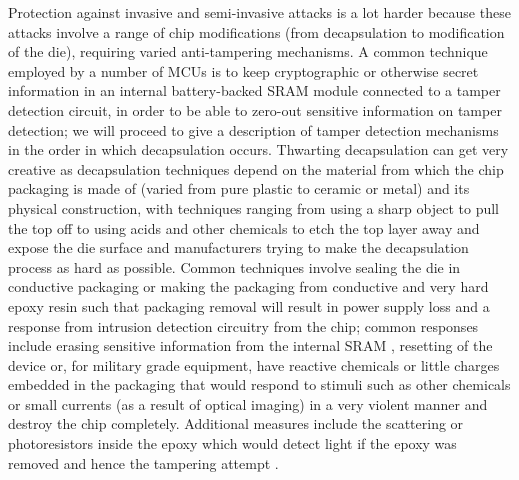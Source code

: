 Protection against invasive and semi-invasive attacks is a lot harder because these attacks involve a range of chip modifications (from decapsulation to modification of the die), requiring varied anti-tampering mechanisms. A common technique employed by a number of MCUs is to keep cryptographic or otherwise secret information in an internal battery-backed SRAM \citep{hwre}  \citep{sergei:thesis} module connected to a tamper detection circuit, in order to be able to zero-out sensitive information on tamper detection; we will proceed to give a description of tamper detection mechanisms in the order in which decapsulation occurs. Thwarting decapsulation can get very creative as decapsulation techniques depend on the material from which the chip packaging is made of (varied from pure plastic to ceramic or metal) and its physical construction, with techniques ranging from using a sharp object to pull the top off \citep{sergei:thesis} to using acids and other chemicals \citep{hwre} \citep{sergei:thesis} to etch the top layer away and expose the die surface and manufacturers trying to make the decapsulation process as hard as possible. Common techniques involve sealing the die in conductive packaging or making the packaging from conductive and very hard epoxy resin such that packaging removal will result in power supply loss and a response from intrusion detection circuitry from the chip; common responses include erasing sensitive information from the internal SRAM \citep{hwre}, resetting of the device \citep{sergei:thesis} or, for military grade equipment, have reactive chemicals or little charges embedded in the packaging that would respond to stimuli such as other chemicals or small currents (as a result of optical imaging) in a very violent manner and destroy the chip completely. Additional measures include the scattering or photoresistors inside the epoxy which would detect light if the epoxy was removed and hence the tampering attempt \citep{sergei:thesis} \citep{hwre}.

